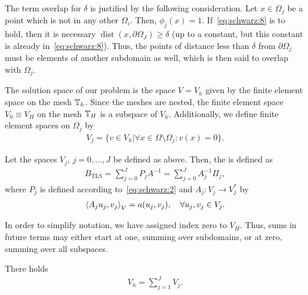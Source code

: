 \begin{note}
  The term overlap for $\delta$ is justified by the following
  consideration. Let $x \in \Omega_j$ be a point which is not in any
  other $\Omega_i$. Then, $\phi_j(x) = 1$. If~\eqref{eq:schwarz:8} is
  to hold, then it is necessary
  $\operatorname{dist}(x,\partial\Omega_J) \ge \delta$ (up to a
  constant, but this constant is already
  in~\eqref{eq:schwarz:8}). Thus, the points of distance less than
  $\delta$ from $\partial\Omega_j$ must be elements of another
  subdomain as well, which is then said to overlap with $\Omega_j$.
\end{note}

\begin{notation}
  The solution space of our problem is the space $V=V_h$ given by the
  finite element space on the mesh $\mathbb T_h$. Since the meshes are
  nested, the finite element space $V_0 \equiv V_H$ on the mesh $\mathbb T_H$ is a
  subspace of $V_h$. Additionally, we define finite element spaces on
  $\Omega_j$ by
  \begin{gather}
    \label{eq:schwarz:9}
    V_j = \bigl\{ v\in V_h \big| \forall x\in\Omega\setminus\Omega_j :
    v(x) =0\bigr\}.
  \end{gather}
\end{notation}

\begin{definition}
  Let the spaces $V_j$, $j=0,\dots,J$ be defined as above. Then, the
   is defined as
  \begin{gather}
    \label{eq:schwarz:10}
    B_{\text{TLS}} = \sum_{j=0}^J P_j A^{-1} = \sum_{j=0}^J A_j^{-1} \Pi_j,
  \end{gather}
  where $P_j$ is defined according to~\eqref{eq:schwarz:2} and $A_j:
  V_j\to V_j^*$ by
  \begin{gather}
    \scal(A_j u_j, v_j)_V = a(u_j, v_j),\quad\forall u_j, v_j \in V_j.
  \end{gather}
\end{definition}

\begin{note}
  In order to simplify notation, we have assigned index zero to
  $V_H$. Thus, sums in future terms may either start at one, summing
  over subdomains, or at zero, summing over all subspaces.
\end{note}

\begin{lemma}
  There holds
  \begin{gather}
    \label{eq:schwarz:11}
    V_h = \sum_{j=1}^J V_j.
  \end{gather}
\end{lemma}

